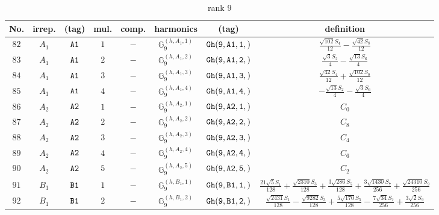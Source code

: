 \documentclass[fleqn,8pt]{jsarticle}
\begin{document}
\begin{table}[ht!]
\begin{center}
\caption{rank 9}
\renewcommand{\arraystretch}{1.3}
\begin{tabular}{cccccccc} \hline \hline
No. & irrep. & (tag) & mul. & comp. & harmonics & (tag) & definition \\ \hline
$ 82 $ & $ A_{1} $ & $ {\tt A1} $ & $ 1 $ & $ - $ & $ \mathbb{G}_{9}^{(h,A_{1},1)} $ & $ {\tt Gh(9,A1,1,)} $ & $ \frac{\sqrt{102} S_{4}}{12} - \frac{\sqrt{42} S_{8}}{12} $ \\
$ 83 $ & $ A_{1} $ & $ {\tt A1} $ & $ 2 $ & $ - $ & $ \mathbb{G}_{9}^{(h,A_{1},2)} $ & $ {\tt Gh(9,A1,2,)} $ & $ \frac{\sqrt{3} S_{2}}{4} - \frac{\sqrt{13} S_{6}}{4} $ \\
$ 84 $ & $ A_{1} $ & $ {\tt A1} $ & $ 3 $ & $ - $ & $ \mathbb{G}_{9}^{(h,A_{1},3)} $ & $ {\tt Gh(9,A1,3,)} $ & $ \frac{\sqrt{42} S_{4}}{12} + \frac{\sqrt{102} S_{8}}{12} $ \\
$ 85 $ & $ A_{1} $ & $ {\tt A1} $ & $ 4 $ & $ - $ & $ \mathbb{G}_{9}^{(h,A_{1},4)} $ & $ {\tt Gh(9,A1,4,)} $ & $ - \frac{\sqrt{13} S_{2}}{4} - \frac{\sqrt{3} S_{6}}{4} $ \\
$ 86 $ & $ A_{2} $ & $ {\tt A2} $ & $ 1 $ & $ - $ & $ \mathbb{G}_{9}^{(h,A_{2},1)} $ & $ {\tt Gh(9,A2,1,)} $ & $ C_{0} $ \\
$ 87 $ & $ A_{2} $ & $ {\tt A2} $ & $ 2 $ & $ - $ & $ \mathbb{G}_{9}^{(h,A_{2},2)} $ & $ {\tt Gh(9,A2,2,)} $ & $ C_{8} $ \\
$ 88 $ & $ A_{2} $ & $ {\tt A2} $ & $ 3 $ & $ - $ & $ \mathbb{G}_{9}^{(h,A_{2},3)} $ & $ {\tt Gh(9,A2,3,)} $ & $ C_{4} $ \\
$ 89 $ & $ A_{2} $ & $ {\tt A2} $ & $ 4 $ & $ - $ & $ \mathbb{G}_{9}^{(h,A_{2},4)} $ & $ {\tt Gh(9,A2,4,)} $ & $ C_{6} $ \\
$ 90 $ & $ A_{2} $ & $ {\tt A2} $ & $ 5 $ & $ - $ & $ \mathbb{G}_{9}^{(h,A_{2},5)} $ & $ {\tt Gh(9,A2,5,)} $ & $ C_{2} $ \\
$ 91 $ & $ B_{1} $ & $ {\tt B1} $ & $ 1 $ & $ - $ & $ \mathbb{G}_{9}^{(h,B_{1},1)} $ & $ {\tt Gh(9,B1,1,)} $ & $ \frac{21 \sqrt{5} S_{1}}{128} + \frac{\sqrt{2310} S_{3}}{128} + \frac{3 \sqrt{286} S_{5}}{128} + \frac{3 \sqrt{1430} S_{7}}{256} + \frac{\sqrt{24310} S_{9}}{256} $ \\
$ 92 $ & $ B_{1} $ & $ {\tt B1} $ & $ 2 $ & $ - $ & $ \mathbb{G}_{9}^{(h,B_{1},2)} $ & $ {\tt Gh(9,B1,2,)} $ & $ \frac{\sqrt{2431} S_{1}}{128} - \frac{\sqrt{9282} S_{3}}{128} + \frac{5 \sqrt{170} S_{5}}{128} - \frac{7 \sqrt{34} S_{7}}{256} + \frac{3 \sqrt{2} S_{9}}{256} $ \\

\end{tabular}
\end{center}
\end{table}
\end{document}
